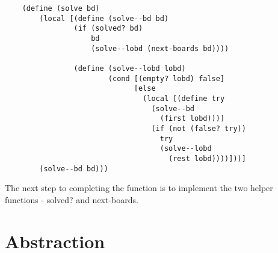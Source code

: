 \documentclass[11pt,a4paper]{report}
\begin{document}
	\begin{verbatim}
	(define (solve bd)
		(local [(define (solve--bd bd)
		        (if (solved? bd)
		            bd
		            (solve--lobd (next-boards bd))))
		            
		        (define (solve--lobd lobd)
		                (cond [(empty? lobd) false]
		                      [else
		                        (local [(define try 
		                          (solve--bd 
		                            (first lobd)))]
		                          (if (not (false? try))
		                            try
		                            (solve--lobd 
		                              (rest lobd))))]))]
		(solve--bd bd)))
	\end{verbatim}
	
	The next step to completing the function is to implement the two helper functions - solved? and
	next-boards.
	
	\chapter{Abstraction}
\end{document}
